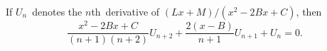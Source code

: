 If $U_{n}$~denotes the $n$th~derivative of $(Lx + M)/(x^{2} - 2Bx + C)$, then
\[
\frac{x^{2} - 2Bx + C}{(n + 1)(n + 2)} U_{n+2}
  + \frac{2(x - B)}{n + 1} U_{n+1} + U_{n} = 0.
\]

